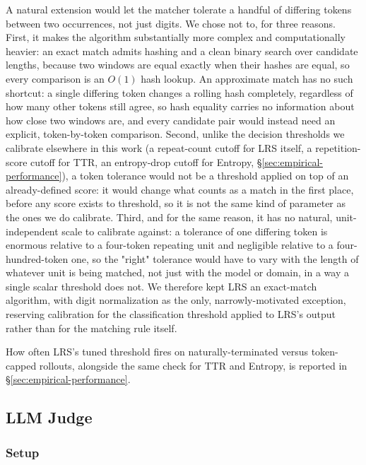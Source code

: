 \documentclass{article}
\begin{document}
A natural extension would let the matcher tolerate a handful of differing
tokens between two occurrences, not just digits. We chose not to, for three
reasons. First, it makes the algorithm substantially more complex and
computationally heavier: an exact match admits hashing and a clean binary
search over candidate lengths, because two windows are equal exactly when
their hashes are equal, so every comparison is an $O(1)$ hash lookup. An
approximate match has no such shortcut: a single differing token changes a
rolling hash completely, regardless of how many other tokens still agree,
so hash equality carries no information about how close two windows are,
and every candidate pair would instead need an explicit,
token-by-token comparison. Second, unlike the decision thresholds we
calibrate elsewhere in this work (a repeat-count cutoff for LRS itself, a
repetition-score cutoff for TTR, an entropy-drop cutoff for Entropy,
\S\ref{sec:empirical-performance}), a token tolerance would not be a
threshold applied on top of an already-defined score: it would change what
counts as a match in the first place, before any score exists to threshold,
so it is not the same kind of parameter as the ones we do calibrate. Third,
and for the same reason, it has no natural, unit-independent scale to
calibrate against: a tolerance of one differing token is enormous relative
to a four-token repeating unit and negligible relative to a four-hundred-token
one, so the "right" tolerance would have to vary with the length of
whatever unit is being matched, not just with the model or domain, in a way
a single scalar threshold does not. We therefore kept LRS an exact-match
algorithm, with digit normalization as the only, narrowly-motivated
exception, reserving calibration for the classification threshold applied
to LRS's output rather than for the matching rule itself.

How often LRS's tuned threshold fires on naturally-terminated versus
token-capped rollouts, alongside the same check for TTR and Entropy, is
reported in \S\ref{sec:empirical-performance}.

\subsection{LLM Judge}
\label{sec:llm-judge-labeling}

\subsubsection{Setup}
\end{document}
